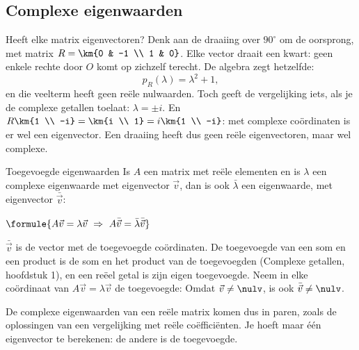 \begin{oefeningen}
\end{oefeningen}

\subsection{Complexe eigenwaarden}

Heeft elke matrix eigenvectoren? Denk aan de draaiing over $90^\circ$ om de oorsprong, met matrix $R = \km{0 & -1 \\ 1 & 0}$. Elke vector draait een kwart: geen enkele rechte door $O$ komt op zichzelf terecht. De algebra zegt hetzelfde:
\[ p_R(\lambda) = \lambda^2 + 1 , \]
en die veelterm heeft geen reële nulwaarden. Toch geeft de vergelijking iets, als je de complexe getallen toelaat: $\lambda = \pm i$. En $R\km{1 \\ -i} = \km{i \\ 1} = i\km{1 \\ -i}$: met complexe coördinaten is er wel een eigenvector. Een draaiing heeft dus geen reële eigenvectoren, maar wel complexe.

\begin{theorie}
\begin{stelling}{Toegevoegde eigenwaarden}
Is $A$ een matrix met reële elementen en is $\lambda$ een complexe eigenwaarde met eigenvector $\vec v$, dan is ook $\bar\lambda$ een eigenwaarde, met eigenvector $\bar{\vec v}$:

\vspace{1mm}
\qquad $\formule{A\vec v = \lambda\vec v \ \Rightarrow \ A\bar{\vec v} = \bar\lambda\bar{\vec v}}$
\end{stelling}

\begin{bewijs}
$\bar{\vec v}$ is de vector met de toegevoegde coördinaten. De toegevoegde van een som en een product is de som en het product van de toegevoegden (Complexe getallen, hoofdstuk 1), en een reëel getal is zijn eigen toegevoegde. Neem in elke coördinaat van $A\vec v = \lambda\vec v$ de toegevoegde:
Omdat $\vec v \neq \nulv$, is ook $\bar{\vec v} \neq \nulv$.
\end{bewijs}
\end{theorie}

De complexe eigenwaarden van een reële matrix komen dus in paren, zoals de oplossingen van een vergelijking met reële coëfficiënten. Je hoeft maar één eigenvector te berekenen: de andere is de toegevoegde.

